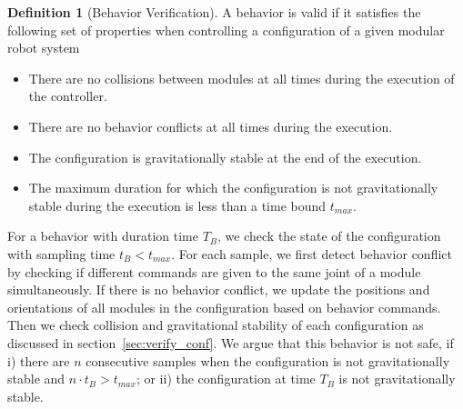 \documentclass[conference]{IEEEtran}
\theoremstyle{definition}
\newtheorem{definition}{Definition}[section]
\newcommand{\TODO}[1]{ {\bf \textcolor{red}{TODO:} #1 }}
\begin{document}
\begin{definition}[Behavior Verification]
A behavior is valid if it satisfies the following set of properties when controlling a configuration of a given modular robot system
\begin{itemize}
\item There are no collisions between modules at all times during the execution of the controller.
\item There are no behavior conflicts at all times during the execution.
\item The configuration is gravitationally stable at the end of the execution.
\item The maximum duration for which the configuration is not gravitationally stable during the execution is less than a time bound $t_{max}$.
\end{itemize}
\end{definition}
For a behavior with duration time $T_B$, we check the state of the configuration with sampling time $t_B<t_{max}$. For each sample, we first detect behavior conflict by checking if different commands are given to the same joint of a module simultaneously. If there is no behavior conflict, we update the positions and orientations of all modules in the configuration based on behavior commands. Then we check collision and gravitational stability of each configuration as discussed in section~\ref{sec:verify_conf}. We argue that this behavior is not safe, if i) there are $n$ consecutive samples when the configuration is not gravitationally stable and $n\cdot t_B > t_{max}$; or ii) the configuration at time $T_B$ is not gravitationally stable.
\end{document}
